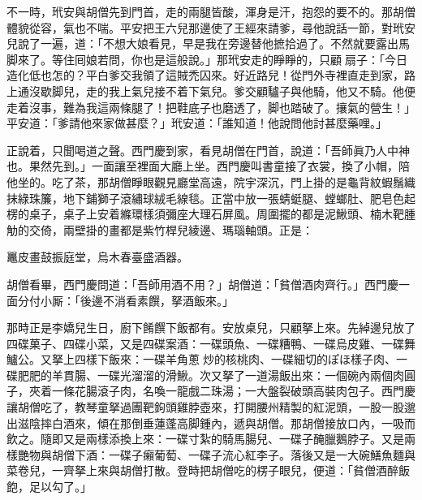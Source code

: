 不一時，玳安與胡僧先到門首，走的兩腿皆酸，渾身是汗，抱怨的要不的。那胡僧體貌從容，氣也不喘。平安把王六兒那邊使了王經來請爹，尋他說話一節，對玳安兒說了一遍，道：「不想大娘看見，早是我在旁邊替他摭拾過了。不然就要露出馬脚來了。等住囘娘若問，你也是這般說。」那玳安走的睜睜的，只顧𢵞扇子：「今日造化低也怎的？平白爹交我領了這賊禿囚來。好近路兒！從門外寺裡直走到家，路上通沒歇脚兒，走的我上氣兒接不着下氣兒。爹交顧驢子與他騎，他又不騎。他便走着沒事，難為我這兩條腿了！把鞋底子也磨透了，脚也踏破了。攘氣的營生！」平安道：「爹請他來家做甚麼？」玳安道：「誰知道！他說問他討甚麼藥哩。」

正說着，只聞喝道之聲。西門慶到家，看見胡僧在門首，說道：「吾師眞乃人中神也。果然先到。」一面讓至裡面大廳上坐。西門慶叫書童接了衣裳，換了小帽，陪他坐的。吃了茶，那胡僧睜眼觀見廳堂高遠，院宇深沉，門上掛的是龜背紋蝦鬚織抹綠珠簾，地下鋪獅子滾繡球絨毛線毯。正當中放一張蜻蜓腿、螳螂肚、肥皂色起楞的桌子，桌子上安着縧環樣須彌座大理石屏風。周圍擺的都是泥鰍頭、楠木靶腫觔的交倚，兩壁掛的畫都是紫竹桿兒綾邊、瑪瑙軸頭。{}正是：

\begin{myquote} 
鼉皮畫鼓振庭堂，烏木春臺盛酒器。
\end{myquote} 

胡僧看畢，西門慶問道：「吾師用酒不用？」胡僧道：「貧僧酒肉齊行。」西門慶一面分付小厮：「後邊不消看素饌，拏酒飯來。」

那時正是李嬌兒生日，廚下餚饌下飯都有。安放桌兒，只顧拏上來。先綽邊兒放了四碟菓子、四碟小菜，又是四碟案酒：一碟頭魚、一碟糟鴨、一碟烏皮雞、一碟舞鱸公。又拏上四樣下飯來：一碟羊角蔥𤆑炒的核桃肉、一碟細切的ぽほ樣子肉、一碟肥肥的羊貫腸、一碟光溜溜的滑鰍。次又拏了一道湯飯出來：一個碗內兩個肉圓子，夾着一條花腸滾子肉，名喚一龍戲二珠湯；一大盤裂破頭高裝肉包子。西門慶讓胡僧吃了，教琴童拏過團靶鉤頭雞脖壺來，打開腰州精製的紅泥頭，一股一股邈出滋陰摔白酒來，傾在那倒垂蓮蓬高脚鍾內，遞與胡僧。那胡僧接放口內，一吸而飲之。隨即又是兩樣添換上來：一碟寸紮的騎馬腸兒、一碟子醃臘鵝脖子。又是兩樣艷物與胡僧下酒：一碟子癩葡萄、一碟子流心紅李子。落後又是一大碗鱔魚麵與菜卷兒，一齊拏上來與胡僧打散。登時把胡僧吃的楞子眼兒，便道：「貧僧酒醉飯飽，足以勾了。」

